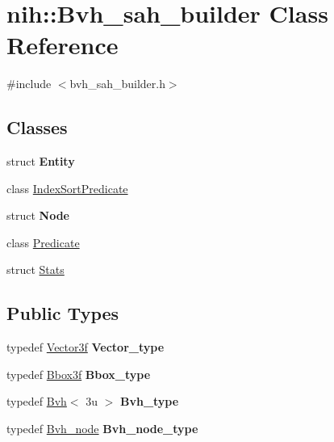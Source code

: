 \hypertarget{classnih_1_1_bvh__sah__builder}{
\section{nih\-:\-:\-Bvh\-\_\-sah\-\_\-builder \-Class \-Reference}
\label{classnih_1_1_bvh__sah__builder}
}


{\ttfamily \#include $<$bvh\-\_\-sah\-\_\-builder.\-h$>$}

\subsection*{\-Classes}
\begin{DoxyCompactItemize}
\item 
struct {\bfseries \-Entity}
\item 
class \hyperlink{classnih_1_1_bvh__sah__builder_1_1_index_sort_predicate}{\-Index\-Sort\-Predicate}
\item 
struct {\bfseries \-Node}
\item 
class \hyperlink{classnih_1_1_bvh__sah__builder_1_1_predicate}{\-Predicate}
\item 
struct \hyperlink{structnih_1_1_bvh__sah__builder_1_1_stats}{\-Stats}
\end{DoxyCompactItemize}
\subsection*{\-Public \-Types}
\begin{DoxyCompactItemize}
\item 
\hypertarget{classnih_1_1_bvh__sah__builder_ab6ec02c7007972f64464d9b57fbb47dd}{
typedef \hyperlink{structnih_1_1_vector}{\-Vector3f} {\bfseries \-Vector\-\_\-type}}
\label{classnih_1_1_bvh__sah__builder_ab6ec02c7007972f64464d9b57fbb47dd}

\item 
\hypertarget{classnih_1_1_bvh__sah__builder_ac14c0fbb425e6a875a964faa5acdbff1}{
typedef \hyperlink{structnih_1_1_bbox}{\-Bbox3f} {\bfseries \-Bbox\-\_\-type}}
\label{classnih_1_1_bvh__sah__builder_ac14c0fbb425e6a875a964faa5acdbff1}

\item 
\hypertarget{classnih_1_1_bvh__sah__builder_a1504c3c33fd376b48b654116328e4a86}{
typedef \hyperlink{structnih_1_1_bvh}{\-Bvh}$<$ 3u $>$ {\bfseries \-Bvh\-\_\-type}}
\label{classnih_1_1_bvh__sah__builder_a1504c3c33fd376b48b654116328e4a86}

\item 
\hypertarget{classnih_1_1_bvh__sah__builder_aa2b24aba75619a74660d9063d6ab5f5c}{
typedef \hyperlink{structnih_1_1_bvh__node}{\-Bvh\-\_\-node} {\bfseries \-Bvh\-\_\-node\-\_\-type}}
\label{classnih_1_1_bvh__sah__builder_aa2b24aba75619a74660d9063d6ab5f5c}

\end{DoxyCompactItemize}
